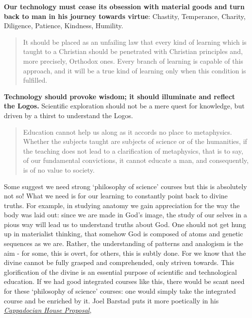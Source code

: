 \documentclass[letterpaper]{article}
\begin{document}
\textbf{Our technology must cease its obsession with material goods and turn back to man in his journey towards virtue}: Chastity, Temperance, Charity, Diligence, Patience, Kindness, Humility.

\begin{quote}
  It should be placed as an unfailing law that every kind of learning which is taught to a Christian should be penetrated with Christian principles and, more precisely, Orthodox ones. Every branch of learning is capable of this approach, and it will be a true kind of learning only when this condition is fulfilled.
\end{quote}

\textbf{Technology should provoke wisdom; it should illuminate and reflect the Logos.} Scientific exploration should not be a mere quest for knowledge, but driven by a thirst to understand the Logos. 

\begin{quote}
  Education cannot help us along as it accords no place to metaphysics. Whether the subjects taught are subjects of science or of the humanities, if the teaching does not lead to a clarification of metaphysics, that is to say, of our fundamental convictions, it cannot educate a man, and consequently, is of no value to society.
\end{quote}

Some suggest we need strong `philosophy of science' courses but this is absolutely not so! What we need is for our learning to constantly point back to divine truths. For example, in studying anatomy we gain appreciation for the way the body was laid out: since we are made in God's image, the study of our selves in a pious way will lead us to understand truths about God. One should not get hung up in materialist thinking, that somehow God is composed of atoms and genetic sequences as we are. Rather, the understanding of patterns and analogism is the aim - for some, this is overt, for others, this is subtly done. For we know that the divine cannot be fully grasped and comprehended, only striven towards. This glorification of the divine is an essential purpose of scientific and technological education. If we had good integrated courses like this, there would be scant need for these `philosophy of science' courses: one would simply take the integrated course and be enriched by it. Joel Barstad puts it more poetically in his \href{https://byzantinela.com/cappadocian-house-proposal/}{\textit{Cappadocian House Proposal}},
\end{document}
